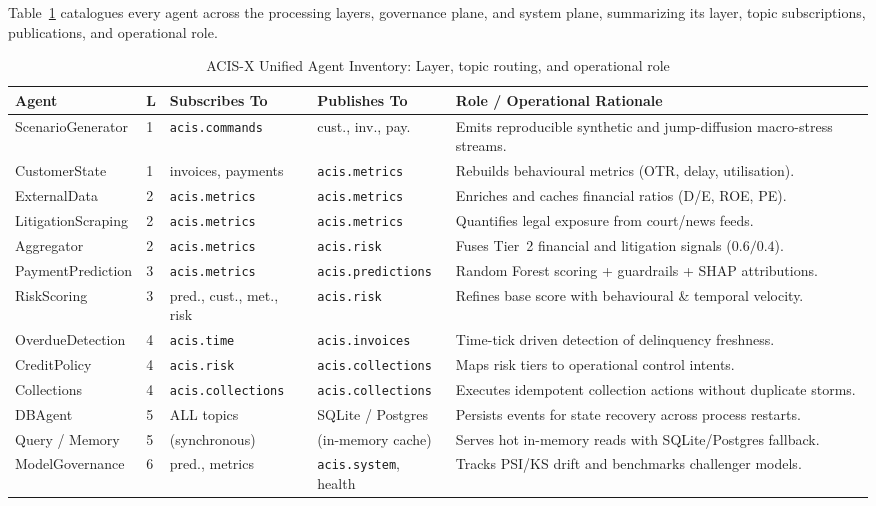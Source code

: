 \documentclass[conference]{IEEEtran}
\begin{document}
Table~\ref{tab:agents} catalogues every agent across the processing layers, governance plane, and system plane, summarizing its layer, topic subscriptions, publications, and operational role.

\begin{table}[t]
\caption{ACIS-X Unified Agent Inventory: Layer, topic routing, and operational role}
\label{tab:agents}
\centering\scriptsize
\begin{tabular}{@{}lp{0.25cm}p{3.2cm}p{3.2cm}p{8.0cm}@{}}
\toprule
\textbf{Agent} & \textbf{L} & \textbf{Subscribes To} & \textbf{Publishes To} & \textbf{Role / Operational Rationale} \\
\midrule
ScenarioGenerator & 1 & \texttt{acis.commands} & cust., inv., pay. & Emits reproducible synthetic and jump-diffusion macro-stress streams. \\
CustomerState & 1 & invoices, payments & \texttt{acis.metrics} & Rebuilds behavioural metrics (OTR, delay, utilisation). \\
ExternalData & 2 & \texttt{acis.metrics} & \texttt{acis.metrics} & Enriches and caches financial ratios (D/E, ROE, PE). \\
LitigationScraping & 2 & \texttt{acis.metrics} & \texttt{acis.metrics} & Quantifies legal exposure from court/news feeds. \\
Aggregator & 2 & \texttt{acis.metrics} & \texttt{acis.risk} & Fuses Tier~2 financial and litigation signals ($0.6/0.4$). \\
PaymentPrediction & 3 & \texttt{acis.metrics} & \texttt{acis.predictions} & Random Forest scoring + guardrails + SHAP attributions. \\
RiskScoring & 3 & pred., cust., met., risk & \texttt{acis.risk} & Refines base score with behavioural \& temporal velocity. \\
OverdueDetection & 4 & \texttt{acis.time} & \texttt{acis.invoices} & Time-tick driven detection of delinquency freshness. \\
CreditPolicy & 4 & \texttt{acis.risk} & \texttt{acis.collections} & Maps risk tiers to operational control intents. \\
Collections & 4 & \texttt{acis.collections} & \texttt{acis.collections} & Executes idempotent collection actions without duplicate storms. \\
DBAgent & 5 & ALL topics & SQLite / Postgres & Persists events for state recovery across process restarts. \\
Query / Memory & 5 & (synchronous) & (in-memory cache) & Serves hot in-memory reads with SQLite/Postgres fallback. \\
ModelGovernance & 6 & pred., metrics & \texttt{acis.system}, health & Tracks PSI/KS drift and benchmarks challenger models. \\
\bottomrule
\end{tabular}
\end{table}
\end{document}
